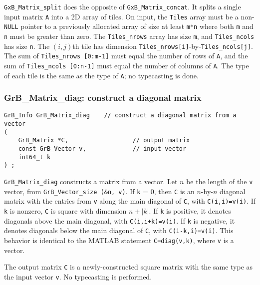 \documentclass[12pt]{article}
\begin{document}
\verb'GxB_Matrix_split' does the opposite of \verb'GxB_Matrix_concat'.  It
splits a single input matrix \verb'A' into a 2D array of tiles.  On input, the
\verb'Tiles' array must be a non-\verb'NULL' pointer to a previously allocated
array of size at least \verb'm*n' where both \verb'm' and \verb'n' must be
greater than zero.  The \verb'Tiles_nrows' array has size \verb'm', and
\verb'Tiles_ncols' has size \verb'n'.  The $(i,j)$th tile has dimension
\verb'Tiles_nrows[i]'-by-\verb'Tiles_ncols[j]'.  The sum of
\verb'Tiles_nrows [0:m-1]' must equal the number of rows of \verb'A', and the
sum of \verb'Tiles_ncols [0:n-1]' must equal the number of columns of \verb'A'.
The type of each tile is the same as the type of \verb'A'; no typecasting is
done.

\subsubsection{{\sf GrB\_Matrix\_diag:} construct a diagonal matrix}
\label{matrix_diag}

\begin{mdframed}[userdefinedwidth=6in]
{\footnotesize
\begin{verbatim}
GrB_Info GrB_Matrix_diag    // construct a diagonal matrix from a vector
(
    GrB_Matrix *C,                  // output matrix
    const GrB_Vector v,             // input vector
    int64_t k
) ;
\end{verbatim} } \end{mdframed}

\verb'GrB_Matrix_diag' constructs a matrix from a vector.  Let $n$ be the
length of the \verb'v' vector, from \verb'GrB_Vector_size (&n, v)'.  If
\verb'k' = 0, then \verb'C' is an $n$-by-$n$ diagonal matrix with the entries
from \verb'v' along the main diagonal of \verb'C', with \verb'C(i,i)=v(i)'.  If
\verb'k' is nonzero, \verb'C' is square with dimension $n+|k|$.  If \verb'k' is
positive, it denotes diagonals above the main diagonal, with
\verb'C(i,i+k)=v(i)'.
If \verb'k' is negative, it denotes diagonals below the main diagonal of
\verb'C', with \verb'C(i-k,i)=v(i)'.  This behavior is identical to the MATLAB
statement \verb'C=diag(v,k)', where \verb'v' is a vector.

The output matrix \verb'C' is a newly-constructed square matrix with the
same type as the input vector \verb'v'.  No typecasting is performed.
\end{document}
